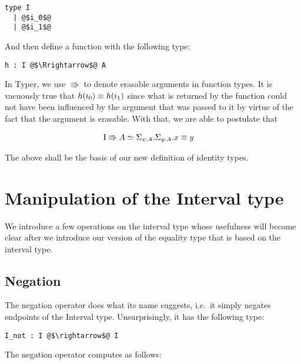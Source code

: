 \documentclass[12pt,twoside,maitrise]{dms}
\theoremstyle{definition}
\numberwithin{equation}{section}
\numberwithin{table}{chapter}
\numberwithin{figure}{chapter}
\begin{document}
\begin{verbatim}
type I
  | @$i_0$@
  | @$i_1$@
\end{verbatim}

And then define a function with the following type:

\begin{verbatim}
h : I @$\Rrightarrow$@ A
\end{verbatim}

In Typer, we use $\Rrightarrow$ to denote erasable arguments in function types.
It is vacuously true that $\eqtype{h(i_0)}{h(i_1)}$ since what is returned by
the function could not have been influenced by the argument that was passed to
it by virtue of the fact that the argument is erasable. With that, we are able
to postulate that

\begin{align*}
  & \bI \Rrightarrow A \simeq \Sigma_{\oftype{x}{A}} . \Sigma_{\oftype{y}{A}} .
  \eqtype{x}{y}
\end{align*}

The above shall be the basis of our new definition of identity types.

\section{Manipulation of the Interval type}

We introduce a few operations on the interval type whose usefulness will become
clear after we introduce our version of the equality type that is based on the
interval type.

\subsection*{Negation}

The negation operator does what its name suggests, i.e.\ it simply negates
endpoints of the Interval type. Unsurprisingly, it has the following type:

\begin{verbatim}
I_not : I @$\rightarrow$@ I
\end{verbatim}

The negation operator computes as follows:
\end{document}
